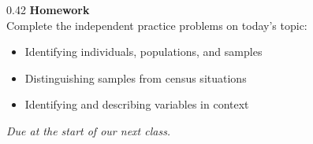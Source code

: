 \documentclass[aspectratio=169, 11pt]{beamer}
\begin{document}
{\begin{frame}[t, plain]
\begin{minipage}{0.9\textwidth}
\begin{columns}[T]
      \begin{column}{0.42\textwidth}
        \small
        {\color{goldacc}\bfseries Homework}\\[5pt]
        {\color{skymid}Complete the independent practice problems on
        today's topic:}\\[5pt]
        \begin{itemize}
          \setlength{\itemsep}{0.35em}\setlength{\topsep}{0em}
          \item {\color{white}Identifying individuals, populations, and
            samples}
          \item {\color{white}Distinguishing samples from census situations}
          \item {\color{white}Identifying and describing variables in context}
        \end{itemize}
        \vspace{0.4cm}
        {\color{skymid}\itshape\small Due at the start of our next class.}
      \end{column}

    \end{columns}
  \end{minipage}
\end{frame}
}
\end{document}
